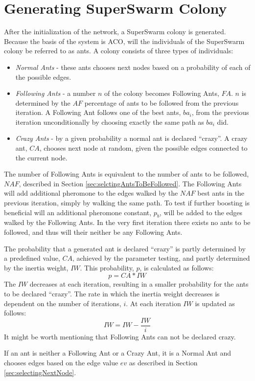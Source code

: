 \section{Generating SuperSwarm Colony}
\label{sec:algoGeneratingSuperSwarm}
After the initialization of the network, a SuperSwarm colony is generated. Because the basis of the system is ACO, will the individuals of the SuperSwarm colony be referred to as ants. A colony consists of three types of individuals:
\begin{itemize}
\item \textit{Normal Ants} - these ants chooses next nodes based on a probability of each of the possible edges. 
\item \textit{Following Ants} - a number $n$ of the colony becomes Following Ants, $FA$. $n$ is determined by the $AF$ percentage of ants to be followed from the previous iteration. A Following Ant follows one of the best ants, $ba_i$, from the previous iteration unconditionally by choosing exactly the same path as $ba_i$ did.
\item \textit{Crazy Ants} - by a given probability a normal ant is declared ``crazy''. A crazy ant, $CA$, chooses next node at random, given the possible edges connected to the current node.  
\end{itemize}
The number of Following Ants is equivalent to the number of ants to be followed, $NAF$, described in Section \vref{sec:selctingAntsToBeFollowed}. The Following Ants will add additional pheromone to the edges walked by the $NAF$ best ants in the previous iteration, simply by walking the same path. To test if further boosting is beneficial will an additional pheromone constant, $p_b$, will be added to the edges walked by the Following Ants. In the very first iteration there exists no ants to be followed, and thus will their neither be any Following Ants. 

The probability that a generated ant is declared ``crazy'' is partly determined by a predefined value, $CA$, achieved by the parameter testing, and partly determined by the inertia weight, $IW$. This probability, $p$, is calculated as follows:
$$p = CA*IW$$
The $IW$ decreases at each iteration, resulting in a smaller probability for the ants to be declared ``crazy''. The rate in which the inertia weight decreases is dependent on the number of iterations, $i$. At each iteration $IW$ is updated as follows:
$$IW = IW - \frac{IW}{i}$$
It might be worth mentioning that Following Ants can not be declared crazy. 

If an ant is neither a Following Ant or a Crazy Ant, it is a Normal Ant and chooses edges based on the edge value $ev$ as described in Section \vref{sec:selectingNextNode}.